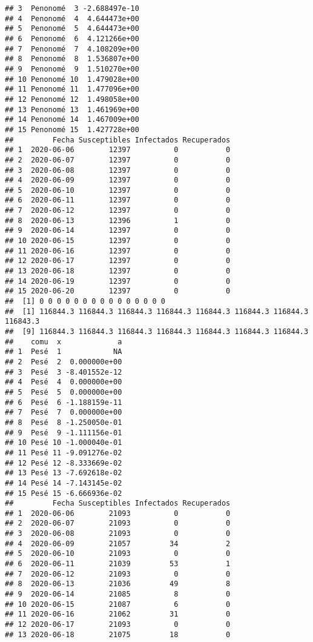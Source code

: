\documentclass[
]{article}
\begin{document}
\begin{verbatim}
## 3  Penonomé  3 -2.688497e-10
## 4  Penonomé  4  4.644473e+00
## 5  Penonomé  5  4.644473e+00
## 6  Penonomé  6  4.121266e+00
## 7  Penonomé  7  4.108209e+00
## 8  Penonomé  8  1.536807e+00
## 9  Penonomé  9  1.510270e+00
## 10 Penonomé 10  1.479028e+00
## 11 Penonomé 11  1.477096e+00
## 12 Penonomé 12  1.498058e+00
## 13 Penonomé 13  1.461969e+00
## 14 Penonomé 14  1.467009e+00
## 15 Penonomé 15  1.427728e+00
##         Fecha Susceptibles Infectados Recuperados
## 1  2020-06-06        12397          0           0
## 2  2020-06-07        12397          0           0
## 3  2020-06-08        12397          0           0
## 4  2020-06-09        12397          0           0
## 5  2020-06-10        12397          0           0
## 6  2020-06-11        12397          0           0
## 7  2020-06-12        12397          0           0
## 8  2020-06-13        12396          1           0
## 9  2020-06-14        12397          0           0
## 10 2020-06-15        12397          0           0
## 11 2020-06-16        12397          0           0
## 12 2020-06-17        12397          0           0
## 13 2020-06-18        12397          0           0
## 14 2020-06-19        12397          0           0
## 15 2020-06-20        12397          0           0
##  [1] 0 0 0 0 0 0 0 0 0 0 0 0 0 0 0
##  [1] 116844.3 116844.3 116844.3 116844.3 116844.3 116844.3 116844.3 116843.3
##  [9] 116844.3 116844.3 116844.3 116844.3 116844.3 116844.3 116844.3
##    comu  x             a
## 1  Pesé  1            NA
## 2  Pesé  2  0.000000e+00
## 3  Pesé  3 -8.401552e-12
## 4  Pesé  4  0.000000e+00
## 5  Pesé  5  0.000000e+00
## 6  Pesé  6 -1.188159e-11
## 7  Pesé  7  0.000000e+00
## 8  Pesé  8 -1.250050e-01
## 9  Pesé  9 -1.111156e-01
## 10 Pesé 10 -1.000040e-01
## 11 Pesé 11 -9.091276e-02
## 12 Pesé 12 -8.333669e-02
## 13 Pesé 13 -7.692618e-02
## 14 Pesé 14 -7.143145e-02
## 15 Pesé 15 -6.666936e-02
##         Fecha Susceptibles Infectados Recuperados
## 1  2020-06-06        21093          0           0
## 2  2020-06-07        21093          0           0
## 3  2020-06-08        21093          0           0
## 4  2020-06-09        21057         34           2
## 5  2020-06-10        21093          0           0
## 6  2020-06-11        21039         53           1
## 7  2020-06-12        21093          0           0
## 8  2020-06-13        21036         49           8
## 9  2020-06-14        21085          8           0
## 10 2020-06-15        21087          6           0
## 11 2020-06-16        21062         31           0
## 12 2020-06-17        21093          0           0
## 13 2020-06-18        21075         18           0

\end{verbatim}
\end{document}
